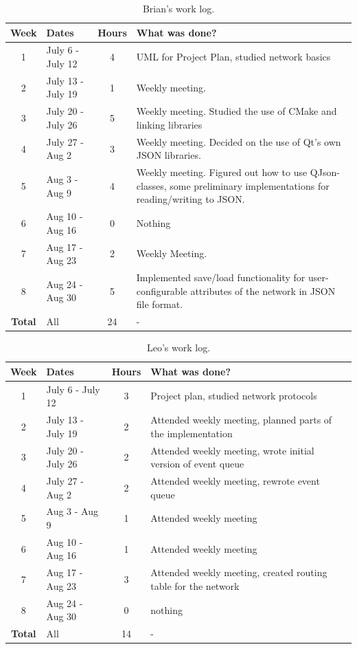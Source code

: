 \begin{table}[!htbp]
\footnotesize{
\begin{tabular}{c|p{}|c|p{}}
\textbf{Week} & \textbf{Dates} & \textbf{Hours} & \textbf{What was done?} \\
\hline 1 & July 6 - July 12     & 4 & UML for Project Plan, studied network basics \\
\hline 2 & July 13 - July 19    & 1 & Weekly meeting. \\
\hline 3 & July 20 - July 26    & 5 & Weekly meeting. Studied the use of CMake and linking libraries \\
\hline 4 & July 27 - Aug 2      & 3 & Weekly meeting. Decided on the use of Qt's own JSON libraries. \\
\hline 5 & Aug 3 - Aug 9        & 4 & Weekly meeting. Figured out how to use QJson-classes, some preliminary implementations for reading/writing to JSON.\\
\hline 6 & Aug 10 - Aug 16      & 0 & Nothing \\
\hline 7 & Aug 17 - Aug 23      & 2 & Weekly Meeting. \\
\hline 8 & Aug 24 - Aug 30      & 5 & Implemented save/load functionality for user-configurable attributes of the network in JSON file format. \\
\hline\hline\textbf{Total}&All  & 24 & - \\
\end{tabular}
}
\caption{Brian's work log. }
\label{table:worklog-brian}
\end{table}

\begin{table}[!htbp]
\footnotesize{
\begin{tabular}{c|p{}|c|p{}}
\textbf{Week} & \textbf{Dates} & \textbf{Hours} & \textbf{What was done?} \\
\hline 1 & July 6 - July 12     & 3 & Project plan, studied network protocols \\
\hline 2 & July 13 - July 19    & 2 & Attended weekly meeting, planned parts of the implementation \\
\hline 3 & July 20 - July 26    & 2 & Attended weekly meeting, wrote initial version of event queue \\
\hline 4 & July 27 - Aug 2      & 2 & Attended weekly meeting, rewrote event queue \\
\hline 5 & Aug 3 - Aug 9        & 1 & Attended weekly meeting \\
\hline 6 & Aug 10 - Aug 16      & 1 & Attended weekly meeting \\
\hline 7 & Aug 17 - Aug 23      & 3 & Attended weekly meeting, created routing table for the network \\
\hline 8 & Aug 24 - Aug 30      & 0 & nothing \\
\hline\hline\textbf{Total}&All  & 14 & - \\
\end{tabular}
}
\caption{Leo's work log. }
\label{table:worklog-leo}
\end{table}
\hfill
